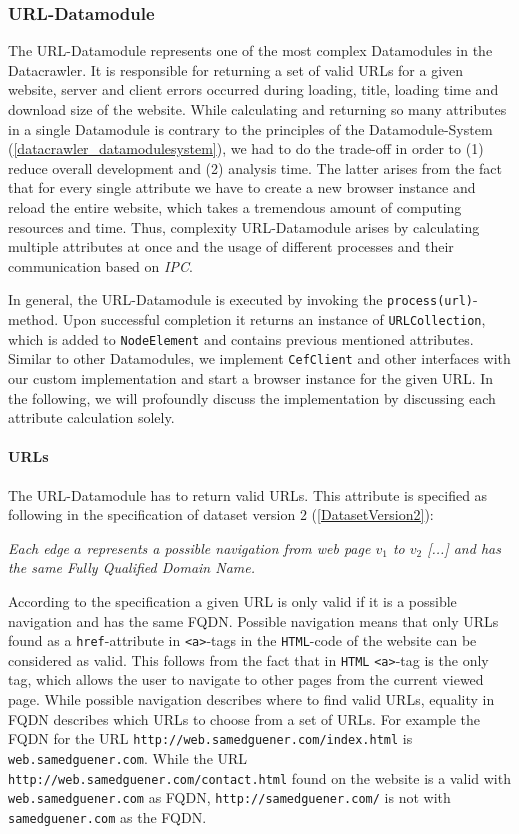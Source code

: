 \subsubsection{URL-Datamodule}
\label{datacrawler_url_datamodule}
The URL-Datamodule represents one of the most complex Datamodules in the Datacrawler. It is responsible for returning a set of valid URLs for a given website, server and client errors occurred during loading, title, loading time and download size of the website. While calculating and returning so many attributes in a single Datamodule is contrary to the principles of the Datamodule-System (\ref{datacrawler_datamodulesystem}), we had to do the trade-off in order to (1) reduce overall development and (2) analysis time. The latter arises from the fact that for every single attribute we have to create a new browser instance and reload the entire website, which takes a tremendous amount of computing resources and time. Thus, complexity URL-Datamodule arises by calculating multiple attributes at once and the usage of different processes and their communication based on \textit{IPC}.

In general, the URL-Datamodule is executed by invoking the \texttt{process(url)}-method. Upon successful completion it returns an instance of \texttt{URLCollection}, which is added to \texttt{NodeElement} and contains previous mentioned attributes. Similar to other Datamodules, we implement \texttt{CefClient} and other interfaces with our custom implementation and start a browser instance for the given URL. In the following, we will profoundly discuss the implementation by discussing each attribute calculation solely.

\paragraph{URLs}
The URL-Datamodule has to return valid URLs. This attribute is specified as following in the specification of dataset version 2 (\ref{DatasetVersion2}):

\begin{center}
	\textit{Each edge $a$ represents a possible navigation from web page $v_1$ to $v_2$ [...] and has the same Fully Qualified Domain Name.}
\end{center}

According to the specification a given URL is only valid if it is a possible navigation and has the same FQDN. Possible navigation means that only URLs found as a \texttt{href}-attribute in \texttt{<a>}-tags in the \texttt{HTML}-code of the website can be considered as valid. This follows from the fact that in \texttt{HTML} \texttt{<a>}-tag is the only tag, which allows the user to navigate to other pages from the current viewed page. While possible navigation describes where to find valid URLs, equality in FQDN describes which URLs to choose from a set of URLs.
For example the FQDN for the URL \texttt{http://web.samedguener.com/index.html} is \texttt{web.samedguener.com}. While the URL \texttt{http://web.samedguener.com/contact.html} found on the website is a valid with \texttt{web.samedguener.com} as FQDN, \texttt{http://samedguener.com/} is not with \texttt{samedguener.com} as the FQDN.

